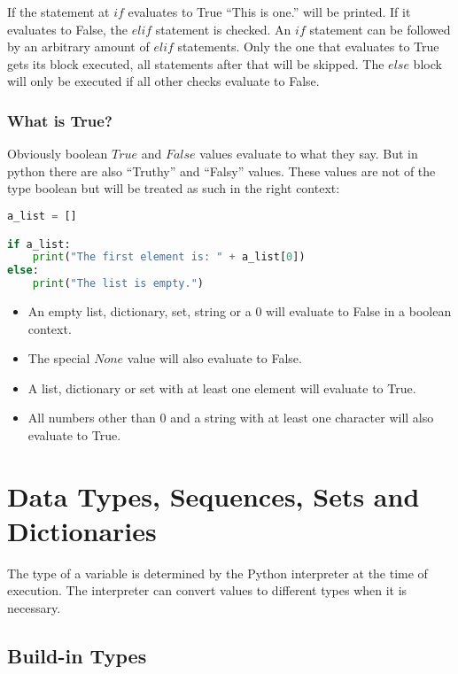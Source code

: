 \documentclass{article}
\begin{document}
If the statement at $if$ evaluates to True ``This is one.'' will be printed.
If it evaluates to False, the $elif$ statement is checked.
An $if$ statement can be followed by an arbitrary amount of $elif$ statements.
Only the one that evaluates to True gets its block executed, all statements
after that will be skipped.
The $else$ block will only be executed if all other checks evaluate to False.

\subsubsection{What is True?}

Obviously boolean $True$ and $False$ values evaluate to what they say.
But in python there are also ``Truthy'' and ``Falsy'' values.
These values are not of the type boolean but will be treated as such in the right context:

\begin{lstlisting}[language=Python]
a_list = []

if a_list:
    print("The first element is: " + a_list[0])
else:
    print("The list is empty.")
\end{lstlisting}

\begin{itemize}
    \item An empty list, dictionary, set, string or a 0 will evaluate to False in a boolean context.
    \item The special $None$ value will also evaluate to False.
    \item A list, dictionary or set with at least one element will evaluate to True.
    \item All numbers other than 0 and a string with at least one character will also evaluate to True.
\end{itemize}






\section{Data Types, Sequences, Sets and Dictionaries}

The type of a variable is determined by the Python interpreter at the time
of execution.
The interpreter can convert values to different types when it is necessary.

\subsection{Build-in Types}
\end{document}
